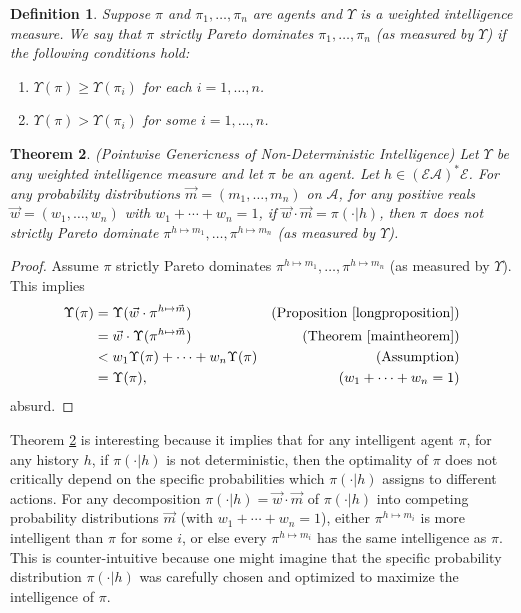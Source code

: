 \documentclass[twoside]{article}
\newtheorem{theorem}{Theorem}
\newtheorem{definition}[theorem]{Definition}
\begin{document}
\begin{definition}
    Suppose $\pi$ and $\pi_1,\ldots,\pi_n$ are agents and $\Upsilon$ is a
    weighted intelligence measure. We say that $\pi$ \emph{strictly Pareto dominates}
    $\pi_1,\ldots,\pi_n$ (as measured by $\Upsilon$) if the following conditions hold:
    \begin{enumerate}
        \item $\Upsilon(\pi)\geq \Upsilon(\pi_i)$ for each $i=1,\ldots,n$.
        \item $\Upsilon(\pi)>\Upsilon(\pi_i)$ for some $i=1,\ldots,n$.
    \end{enumerate}
\end{definition}

\begin{theorem}
\label{pointwisegenericnessthm}
    (Pointwise Genericness of Non-Deterministic Intelligence)
    Let $\Upsilon$ be any weighted intelligence measure and let
    $\pi$ be an agent.
    Let $h\in (\mathcal E\mathcal A)^*\mathcal E$.
    For any probability distributions $\vec m=(m_1,\ldots,m_n)$ on $\mathcal A$,
    for any positive reals $\vec w=(w_1,\ldots,w_n)$ with $w_1+\cdots+w_n=1$,
    if $\vec w\cdot\vec m=\pi(\cdot|h)$,
    then $\pi$ does not strictly Pareto dominate
    $\pi^{h\mapsto m_1},\ldots,\pi^{h\mapsto m_n}$
    (as measured by $\Upsilon$).
\end{theorem}

\begin{proof}
    Assume $\pi$ strictly Pareto dominates $\pi^{h\mapsto m_1},\ldots,\pi^{h\mapsto m_n}$
    (as measured by $\Upsilon$).
    This implies
    \begin{align*}
        \Upsilon(\pi)
            &= \Upsilon(\vec w\cdot\pi^{h\mapsto\vec m})
                &\mbox{(Proposition \ref{longproposition})}\\
            &= \vec w\cdot\Upsilon(\pi^{h\mapsto\vec m})
                &\mbox{(Theorem \ref{maintheorem})}\\
            &< w_1\Upsilon(\pi)+\cdots+w_n\Upsilon(\pi)
                &\mbox{(Assumption)}\\
            &= \Upsilon(\pi),
                &\mbox{($w_1+\cdots+w_n=1$)}
    \end{align*}
    absurd.
\end{proof}

Theorem \ref{pointwisegenericnessthm} is interesting because it implies that for
any intelligent agent $\pi$, for any history $h$, if $\pi(\cdot|h)$ is not deterministic,
then the optimality of $\pi$ does not critically depend on the specific probabilities
which $\pi(\cdot|h)$ assigns to different actions. For any decomposition
$\pi(\cdot|h)=\vec w\cdot\vec m$ of $\pi(\cdot|h)$ into competing probability
distributions $\vec m$
(with $w_1+\cdots+w_n=1$), either $\pi^{h\mapsto m_i}$ is more intelligent
than $\pi$ for some $i$, or else every $\pi^{h\mapsto m_i}$ has the same intelligence as
$\pi$. This is counter-intuitive because one might imagine that the specific probability
distribution $\pi(\cdot|h)$ was carefully chosen and optimized to maximize the intelligence
of $\pi$.
\end{document}
